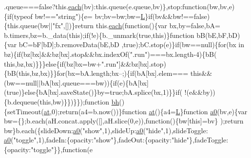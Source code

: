 \begin{DoxyCode}
      .queue===\textcolor{keyword}{false}?this.\hyperlink{jquery_8js_a871ff39db627c54c710a3e9909b8234c}{each}(bv):this.queue(e.queue,bv)\},stop:function(bw,bv,e)\{\textcolor{keywordflow}{if}(typeof bw!==\textcolor{stringliteral}{"string"})\{e=
      bv;bv=bw;bw=\hyperlink{jquery_8js_a38ee4c0b5f4fe2a18d0c783af540d253}{L}\}\textcolor{keywordflow}{if}(bv&&bw!==\textcolor{keyword}{false})\{this.queue(bw||\textcolor{stringliteral}{"fx"},[])\}\textcolor{keywordflow}{return} this.\hyperlink{jquery_8js_a871ff39db627c54c710a3e9909b8234c}{each}(\textcolor{keyword}{function}()\{var bx,by=\textcolor{keyword}{false},bA=
      b.timers,bz=b.\_data(\textcolor{keyword}{this});\textcolor{keywordflow}{if}(!e)\{b.\_unmark(\textcolor{keyword}{true},\textcolor{keyword}{this})\}\textcolor{keyword}{function} bB(bE,bF,bD)\{var bC=bF[bD];b.removeData(bE,bD
      ,\textcolor{keyword}{true});bC.stop(e)\}\textcolor{keywordflow}{if}(bw==null)\{\textcolor{keywordflow}{for}(bx in bz)\{\textcolor{keywordflow}{if}(bz[bx]&&bz[bx].stop&&bx.indexOf(\textcolor{stringliteral}{".run"})===bx.length-4)\{bB(\textcolor{keyword}{
      this},bz,bx)\}\}\}\textcolor{keywordflow}{else}\{\textcolor{keywordflow}{if}(bz[bx=bw+\textcolor{stringliteral}{".run"}]&&bz[bx].stop)\{bB(\textcolor{keyword}{this},bz,bx)\}\}\textcolor{keywordflow}{for}(bx=bA.length;bx--;)\{\textcolor{keywordflow}{if}(bA[bx].elem===\textcolor{keyword}{
      this}&&(bw==null||bA[bx].queue===bw))\{\textcolor{keywordflow}{if}(e)\{bA[bx](\textcolor{keyword}{true})\}\textcolor{keywordflow}{else}\{bA[bx].saveState()\}by=\textcolor{keyword}{true};bA.splice(bx,1)\}\}\textcolor{keywordflow}{if}(
      !(e&&by))\{b.dequeue(\textcolor{keyword}{this},bw)\}\})\}\});\textcolor{keyword}{function} \hyperlink{jquery_8js_a6fc9115e5c9c910cae480abf0a8c7ae3}{bh}()\{setTimeout(\hyperlink{jquery_8js_a31b1c836ab707421c59d8f31b49a8f68}{at},0);\textcolor{keywordflow}{return}(a4=b.now())\}\textcolor{keyword}{function} 
      \hyperlink{jquery_8js_a31b1c836ab707421c59d8f31b49a8f68}{at}()\{a4=\hyperlink{jquery_8js_a38ee4c0b5f4fe2a18d0c783af540d253}{L}\}\textcolor{keyword}{function} \hyperlink{jquery_8js_ab5b2b69c05d6a629ddd1deebef38735e}{a0}(bv,e)\{var bw=\{\};b.each(aH.concat.apply([],aH.slice(0,e)),\textcolor{keyword}{function}()\{bw[\textcolor{keyword}{this}]=bv\}
      );\textcolor{keywordflow}{return} bw\}b.each(\{slideDown:\hyperlink{jquery_8js_ab5b2b69c05d6a629ddd1deebef38735e}{a0}(\textcolor{stringliteral}{"show"},1),slideUp:\hyperlink{jquery_8js_ab5b2b69c05d6a629ddd1deebef38735e}{a0}(\textcolor{stringliteral}{"hide"},1),slideToggle:
      \hyperlink{jquery_8js_ab5b2b69c05d6a629ddd1deebef38735e}{a0}(\textcolor{stringliteral}{"toggle"},1),fadeIn:\{opacity:\textcolor{stringliteral}{"show"}\},fadeOut:\{opacity:\textcolor{stringliteral}{"hide"}\},fadeToggle:\{opacity:\textcolor{stringliteral}{"toggle"}\}\},\textcolor{keyword}{function}(e

\end{DoxyCode}
